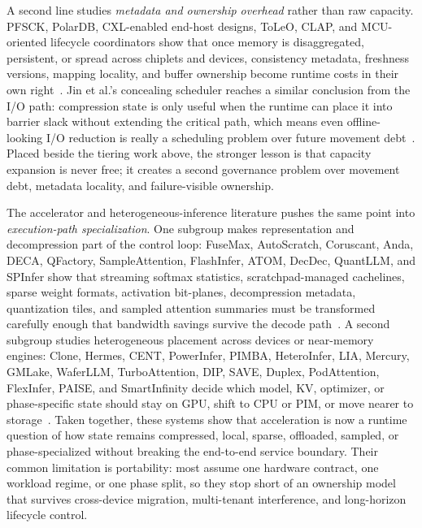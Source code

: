 \documentclass[acmsmall,screen,review]{acmart}
\begin{document}
A second line studies \emph{metadata and ownership overhead} rather than raw capacity. PFSCK, PolarDB, CXL-enabled end-host designs, ToLeO, CLAP, and MCU-oriented lifecycle coordinators show that once memory is disaggregated, persistent, or spread across chiplets and devices, consistency metadata, freshness versions, mapping locality, and buffer ownership become runtime costs in their own right~\cite{domingo2021pfsck,cao2020polardb,ji2025cxl,dong2024toleo,park2025clap,zheng2024vmcu}. Jin et al.'s concealing scheduler reaches a similar conclusion from the I/O path: compression state is only useful when the runtime can place it into barrier slack without extending the critical path, which means even offline-looking I/O reduction is really a scheduling problem over future movement debt~\cite{jin2024concealing}. Placed beside the tiering work above, the stronger lesson is that capacity expansion is never free; it creates a second governance problem over movement debt, metadata locality, and failure-visible ownership.

The accelerator and heterogeneous-inference literature pushes the same point into \emph{execution-path specialization}. One subgroup makes representation and decompression part of the control loop: FuseMax, AutoScratch, Coruscant, Anda, DECA, QFactory, SampleAttention, FlashInfer, ATOM, DecDec, QuantLLM, and SPInfer show that streaming softmax statistics, scratchpad-managed cachelines, sparse weight formats, activation bit-planes, decompression metadata, quantization tiles, and sampled attention summaries must be transformed carefully enough that bandwidth savings survive the decode path~\cite{nayak2024fusemax,fu2024autoscratch,joo2025coruscant,fang2025anda,gerogiannis2025deca,zhang2025qfactory,zhu2024sampleattention,ye2025flashinfer,zhao2024atom,park2025decdec,xia2024quantllm,fan2025spinfer}. A second subgroup studies heterogeneous placement across devices or near-memory engines: Clone, Hermes, CENT, PowerInfer, PIMBA, HeteroInfer, LIA, Mercury, GMLake, WaferLLM, TurboAttention, DIP, SAVE, Duplex, PodAttention, FlexInfer, PAISE, and SmartInfinity decide which model, KV, optimizer, or phase-specific state should stay on GPU, shift to CPU or PIM, or move nearer to storage~\cite{tian2025clone,liu2025hermes,gu2025cent,song2024powerinfer,kim2025pimba,chen2025heteroinfer,kim2025lia,mercury2025rms,guo2024gmlake,he2025waferllm,kang2025turboattention,federici2025dip,zheng2025save,yun2024duplex,kamath2025podattention,na2025flexinfer,kim2025paise,jang2024smartinfinity}. Taken together, these systems show that acceleration is now a runtime question of how state remains compressed, local, sparse, offloaded, sampled, or phase-specialized without breaking the end-to-end service boundary. Their common limitation is portability: most assume one hardware contract, one workload regime, or one phase split, so they stop short of an ownership model that survives cross-device migration, multi-tenant interference, and long-horizon lifecycle control.
\end{document}
